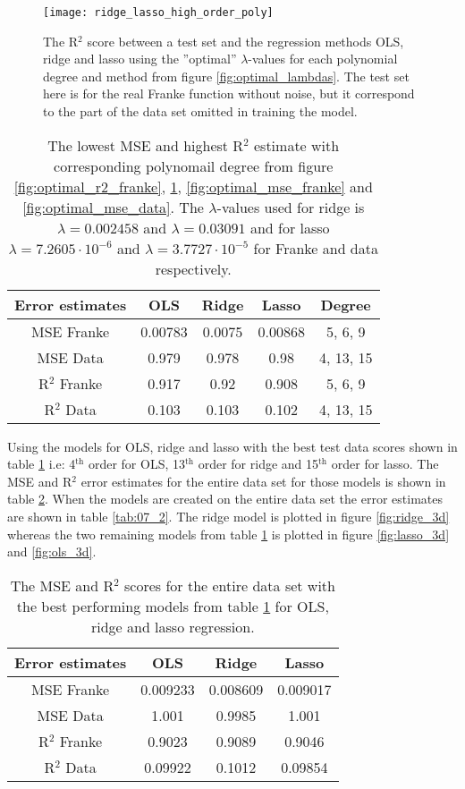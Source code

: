 \documentclass[uio,jmp,amsmath,amssymb,reprint,nofootinbib]{revtex4-1}
\numberwithin{equation}{section}
\begin{document}
\begin{figure}[H]
    \centering
    \texttt{[image: ridge\_lasso\_high\_order\_poly]}
    \caption{The R\(^2\) score between a test set and the regression methods OLS, ridge and lasso using the ''optimal'' \(\lambda\)-values for each polynomial degree and method from figure \ref{fig:optimal_lambdas}. The test set here is for the real Franke function without noise, but it correspond to the part of the data set omitted in training the model.}
    \label{fig:optimal_r2_data}
\end{figure}

\begin{table}
\begin{tabular}{|c|c|c|c|c|}\hline
Error estimates & OLS & Ridge & Lasso & Degree\\ \hline
MSE Franke & 0.00783 & 0.0075 & 0.00868 & 5, 6, 9 \\ \hline
MSE Data & 0.979 & 0.978 & 0.98 & 4, 13, 15 \\ \hline
R\(^2\) Franke & 0.917 & 0.92 & 0.908 & 5, 6, 9 \\ \hline
R\(^2\) Data & 0.103 & 0.103 & 0.102 & 4, 13, 15 \\ \hline
\end{tabular}
\caption{The lowest MSE and highest R\(^2\) estimate with corresponding polynomail degree from figure \ref{fig:optimal_r2_franke}, \ref{fig:optimal_r2_data}, \ref{fig:optimal_mse_franke} and \ref{fig:optimal_mse_data}. The \(\lambda\)-values used for ridge is \(\lambda = 0.002458\) and \(\lambda = 0.03091\) and for lasso \(\lambda = 7.2605\cdot 10^{-6}\) and \(\lambda = 3.7727\cdot 10^{-5}\) for Franke and data respectively.}
\label{tab:06}
\end{table}

Using the models for OLS, ridge and lasso with the best test data scores shown in table \ref{tab:06} i.e: 4\(^\text{th}\) order for OLS, 13\(^\text{th}\) order for ridge and 15\(^\text{th}\) order for lasso. The MSE and R\(^2\) error estimates for the entire data set for those models is shown in table \ref{tab:07}. When the models are created on the entire data set the error estimates are shown in table \ref{tab:07_2}. The ridge model is plotted in figure \ref{fig:ridge_3d} whereas the two remaining models from table \ref{tab:06} is plotted in figure \ref{fig:lasso_3d} and \ref{fig:ols_3d}.

\begin{table}
\begin{tabular}{|c|c|c|c|}\hline
Error estimates & OLS & Ridge & Lasso \\ \hline
MSE Franke & 0.009233 & 0.008609 & 0.009017 \\ \hline
MSE Data & 1.001 & 0.9985 & 1.001 \\ \hline
R\(^2\) Franke & 0.9023 & 0.9089 & 0.9046 \\ \hline
R\(^2\) Data & 0.09922 & 0.1012 & 0.09854 \\ \hline
\end{tabular}
\caption{The MSE and R\(^2\) scores for the entire data set with the best performing models from table \ref{tab:06} for OLS, ridge and lasso regression.}
\label{tab:07}
\end{table}
\end{document}
